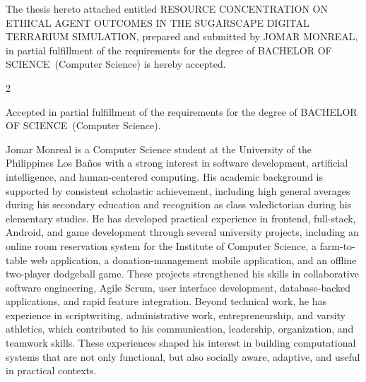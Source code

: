\documentclass{icsthesis}
\renewcommand{\TITLE}{RESOURCE CONCENTRATION ON ETHICAL AGENT OUTCOMES IN THE SUGARSCAPE \mbox{DIGITAL} TERRARIUM SIMULATION}
\renewcommand{\AUTHOR}{JOMAR MONREAL}
\renewcommand{\DEGREE}{BACHELOR OF SCIENCE}
\renewcommand{\MAJOR}{Computer Science}
\begin{document}
	
	\begin{frontmatter}
		\maketitle
				
		\begin{approvalpage}
			The thesis hereto attached entitled \TITLE , prepared and submitted by \AUTHOR , in partial fulfillment of the requirements for the degree of \DEGREE\ (\MAJOR) is hereby accepted.
			
			\begin{multicols}{2}
				\centering
				\columnbreak
			\end{multicols}

			Accepted in partial fulfillment of the requirements for the degree of \DEGREE\ (\MAJOR).
		\end{approvalpage}
		
		\begin{biosketch}
			Jomar Monreal is a Computer Science student at the University of the Philippines Los Ba\~{n}os with a strong interest in software development, artificial intelligence, and human-centered computing. His academic background is supported by consistent scholastic achievement, including high general averages during his secondary education and recognition as class valedictorian during his elementary studies. He has developed practical experience in frontend, full-stack, Android, and game development through several university projects, including an online room reservation system for the Institute of Computer Science, a farm-to-table web application, a donation-management mobile application, and an offline two-player dodgeball game. These projects strengthened his skills in collaborative software engineering, Agile Scrum, user interface development, database-backed applications, and rapid feature integration. Beyond technical work, he has experience in scriptwriting, administrative work, entrepreneurship, and varsity athletics, which contributed to his communication, leadership, organization, and teamwork skills. These experiences shaped his interest in building computational systems that are not only functional, but also socially aware, adaptive, and useful in practical contexts.


\end{biosketch}
\end{frontmatter}
\end{document}
